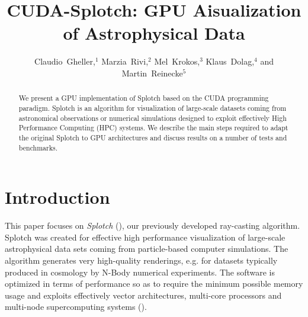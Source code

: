 
\resetcounters




\title{CUDA-Splotch: GPU Aisualization of Astrophysical Data}
\author{Claudio~Gheller,$^1$ Marzia~Rivi,$^2$ Mel~Krokos,$^3$ Klaus~Dolag,$^4$ and Martin~Reinecke$^5$
}


\begin{abstract}
We present a GPU implementation of Splotch
 based on the CUDA programming paradigm. Splotch is an algorithm for visualization of large-scale datasets coming from astronomical observations or numerical simulations designed to exploit effectively High Performance Computing (HPC) systems. We describe the main steps required to adapt the original Splotch to GPU architectures and discuss results on a number of tests and benchmarks.

\end{abstract}

\section{Introduction}

This paper focuses on {\it {}Splotch} (\citet{2008NJPh...10l5006D}), our previously developed ray-casting algorithm. Splotch was created for effective high performance visualization of large-scale astrophysical data sets coming from particle-based computer simulations. The algorithm generates very high-quality renderings, e.g. for datasets typically produced in cosmology by N-Body numerical experiments. The software is optimized in terms of performance so as to require the minimum possible memory usage and exploits effectively vector architectures, multi-core processors and multi-node supercomputing systems (\citet{jin:high-performance}).

